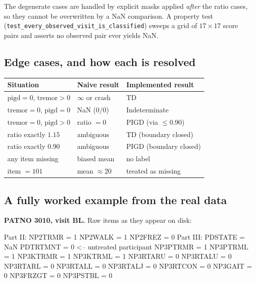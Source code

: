 \documentclass[11pt,a4paper]{article}
\newcommand{\code}[1]{\texttt{\small #1}}
\begin{document}
\noindent
The degenerate cases are handled by explicit masks applied \emph{after} the
ratio cases, so they cannot be overwritten by a NaN comparison. A property test
(\code{test\_every\_observed\_visit\_is\_classified}) sweeps a grid of
$17 \times 17$ score pairs and asserts no observed pair ever yields NaN.

\subsection{Edge cases, and how each is resolved}

\begin{table}[h]
\centering
\small
\begin{tabular}{@{}lll@{}}
\toprule
\textbf{Situation} & \textbf{Naive result} & \textbf{Implemented result} \\
\midrule
$\text{pigd}=0$, $\text{tremor}>0$   & $\infty$ or crash & TD \\
$\text{tremor}=0$, $\text{pigd}=0$   & NaN ($0/0$)       & Indeterminate \\
$\text{tremor}=0$, $\text{pigd}>0$   & ratio $=0$        & PIGD (via $\leq 0.90$) \\
ratio exactly $1.15$                 & ambiguous         & TD (boundary closed) \\
ratio exactly $0.90$                 & ambiguous         & PIGD (boundary closed) \\
any item missing                     & biased mean       & no label \\
item $= 101$                         & mean $\approx 20$ & treated as missing \\
\bottomrule
\end{tabular}
\end{table}

\subsection{A fully worked example from the real data}

\textbf{PATNO 3010, visit BL.} Raw items as they appear on disk:

\begin{codeblock}
Part II:   NP2TRMR = 1     NP2WALK = 1     NP2FREZ = 0
Part III:  PDSTATE = NaN   PDTRTMNT = 0            <-- untreated participant
           NP3PTRMR = 1  NP3PTRML = 1  NP3KTRMR = 1  NP3KTRML = 1
           NP3RTARU = 0  NP3RTALU = 0  NP3RTARL = 0  NP3RTALL = 0
           NP3RTALJ = 0  NP3RTCON = 0
           NP3GAIT  = 0  NP3FRZGT = 0  NP3PSTBL = 0
\end{codeblock}
\end{document}

